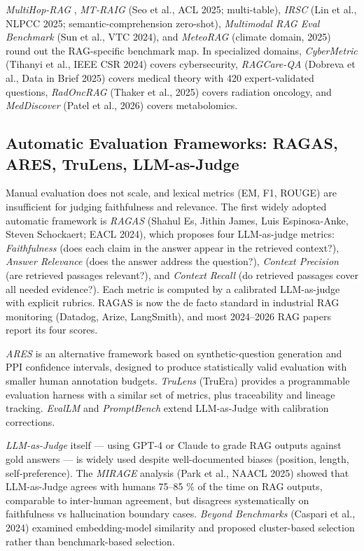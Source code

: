 \documentclass{article}
\begin{document}
\emph{MultiHop-RAG} \citep{tang2024multihopragbenchma}, \emph{MT-RAIG} (Seo et al., ACL 2025; multi-table), \emph{IRSC} (Lin et al., NLPCC 2025; semantic-comprehension zero-shot), \emph{Multimodal RAG Eval Benchmark} (Sun et al., VTC 2024), and \emph{MeteoRAG} (climate domain, 2025) round out the RAG-specific benchmark map. In specialized domains, \emph{CyberMetric} (Tihanyi et al., IEEE CSR 2024) covers cybersecurity, \emph{RAGCare-QA} (Dobreva et al., Data in Brief 2025) covers medical theory with 420 expert-validated questions, \emph{RadOncRAG} (Thaker et al., 2025) covers radiation oncology, and \emph{MedDiscover} (Patel et al., 2026) covers metabolomics.

\subsection{Automatic Evaluation Frameworks: RAGAS, ARES, TruLens, LLM-as-Judge}\label{automatic-evaluation-frameworks-ragas-ares-trulens-llm-as-judge}

Manual evaluation does not scale, and lexical metrics (EM, F1, ROUGE) are insufficient for judging faithfulness and relevance. The first widely adopted automatic framework is \emph{RAGAS} (Shahul Es, Jithin James, Luis Espinosa-Anke, Steven Schockaert; EACL 2024), which proposes four LLM-as-judge metrics: \emph{Faithfulness} (does each claim in the answer appear in the retrieved context?), \emph{Answer Relevance} (does the answer address the question?), \emph{Context Precision} (are retrieved passages relevant?), and \emph{Context Recall} (do retrieved passages cover all needed evidence?). Each metric is computed by a calibrated LLM-as-judge with explicit rubrics. RAGAS is now the de facto standard in industrial RAG monitoring (Datadog, Arize, LangSmith), and most 2024--2026 RAG papers report its four scores.

\emph{ARES} \citep{saadfalcon2024aresanautomatedeva} is an alternative framework based on synthetic-question generation and PPI confidence intervals, designed to produce statistically valid evaluation with smaller human annotation budgets. \emph{TruLens} (TruEra) provides a programmable evaluation harness with a similar set of metrics, plus traceability and lineage tracking. \emph{EvalLM} and \emph{PromptBench} extend LLM-as-Judge with calibration corrections.

\emph{LLM-as-Judge} itself --- using GPT-4 or Claude to grade RAG outputs against gold answers --- is widely used despite well-documented biases (position, length, self-preference). The \emph{MIRAGE} analysis (Park et al., NAACL 2025) showed that LLM-as-Judge agrees with humans 75--85 \% of the time on RAG outputs, comparable to inter-human agreement, but disagrees systematically on faithfulness vs hallucination boundary cases. \emph{Beyond Benchmarks} (Caspari et al., 2024) examined embedding-model similarity and proposed cluster-based selection rather than benchmark-based selection.
\end{document}
